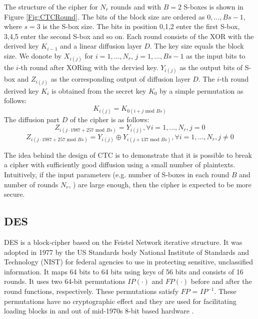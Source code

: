 The structure of the cipher for $N_r$ rounds and with $B=2$ S-boxes is shown in Figure \ref{Fig:CTCRound}. The bits of the block size are ordered as $0,...,Bs-1$, where $s=3$ is the S-box size. The bits in position 0,1,2 enter the first S-box, 3,4,5 enter the second S-box and so on. Each round consists of the XOR with the derived key $K_{i-1}$ and a linear diffusion layer $D$. The key size equals the block size. We donote by $X_{i(j)}$ for $i = 1, ... , N_r$, $j = 1, ... , Bs-1$ as the input bits to the $i$-th round after XORing with the dervied key. $Y_{i(j)}$ as the output bits of S-box and $Z_{i(j)}$ as the corresponding output of diffusion layer $D$. The $i$-th round derived key $K_i$ is obtained from the secret key $K_0$ by a simple permutation as follows:
\begin{equation}
K_{i(j)} = K_{0(i+j \text{ mod } Bs)}
\end{equation}
The diffusion part $D$ of the cipher is as follows:
\begin{equation}
Z_{i(j \cdot 1987 + 257 \text{ mod } Bs)} = Y_{i(j)}, \forall i = 1,...,N_{r}, j=0
\end{equation}
\begin{equation}
Z_{i(j \cdot 1987 + 257 \text{ mod } Bs)} = Y_{i(j)} \oplus Y_{i(j+137 \text{ mod } Bs)} , \forall i = 1,...,N_{r}, j \neq 0
\end{equation}

The idea behind the design of CTC is to
demonstrate that it is possible to break a cipher with sufficiently good diffusion using
a small number of plaintexts. Intuitively, if the input parameters
(e.g. number of S-boxes in each round $B$ and number of rounds $N_r$, ) are large
enough, then the cipher is expected to be more secure.

\subsection{DES}
DES is a block-cipher based on the Feistel Network iterative structure. It was adopted in 1977 by the US Standards body National Institute of Standards and Technology (NIST) for federal agencies to use in protecting sensitive, unclassified information. It maps 64 bits to 64 bits using keys of 56 bits and consists of 16 rounds. It uses two 64-bit permutations $IP(\cdot)$ and $FP(\cdot)$ before and after the round functions, respectively. These permutations satisfy $FP$ = $IP^{-1}$. These permutations have no cryptographic effect and they are used for facilitating loading blocks in and out of mid-1970s 8-bit based hardware \cite{schneier1996applied}.

